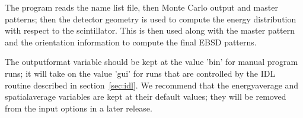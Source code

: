 \documentclass[DIV=calc, paper=letter, fontsize=11pt]{scrartcl}	 %
\begin{document}
The program reads the name list file, then Monte Carlo output and master patterns;  then the detector geometry is used to
compute the energy distribution with respect to the scintillator.  This is then used along with the master pattern and the 
orientation information to compute the final EBSD patterns.  
%

The \textsf{outputformat} variable should be kept at the value \textsf{'bin'} for manual program runs; it will take on 
the value \textsf{'gui'} for runs that are controlled by the IDL routine described in section~\ref{sec:idl}.  We recommend
that the \textsf{energyaverage} and \textsf{spatialaverage} variables are kept at their default values; they will be removed 
from the input options in a later release.

%


\newpage
\end{document}
